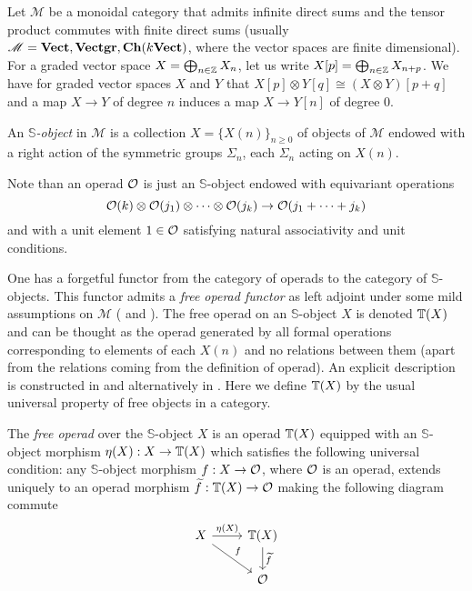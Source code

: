 \documentclass[TFM.tex]{subfiles}
\begin{document}
Let $\mathscr{M}$ be a monoidal category that admits infinite direct sums and the tensor product commutes with finite direct sums (usually $\mathscr{M}=\mathrm{\mathbf{Vect}}, \mathrm{\mathbf{Vectgr}},\mathrm{\mathbf{Ch}}(k\mathrm{\mathbf{Vect}})$, where the vector spaces are finite dimensional). For a graded vector space $X=\bigoplus_{n\in\mathbb{Z}}X_n$, let us write $X[p]=\bigoplus_{n\in\mathbb{Z}}X_{n+p}$. We have for graded vector spaces $X$ and $Y$ that $X[p]\otimes Y[q]\cong (X\otimes Y)[p+q]$ and a map $X\to Y$ of degree $n$ induces a map $X\to Y[n]$ of degree 0. 

\begin{defi}
 An \emph{$\mathbb{S}$-object} in $\mathscr{M}$ is a collection $X=\{X(n)\}_{n\geq 0}$ of objects of $\mathscr{M}$ endowed with a right action of the symmetric groups $\Sigma_n$, each $\Sigma_n$ acting on $X(n)$.
\end{defi}

Note than an operad ${\mathcal O}$ is just an $\mathbb{S}$-object endowed with
equivariant operations
\[{\mathcal O}(k)\otimes{\mathcal O}(j_1)\otimes\cdots\otimes{\mathcal O}(j_k)\to {\mathcal O}(j_1+\cdots+j_k)\]
and with a unit element $1 \in{\mathcal O}$ satisfying natural associativity and unit conditions.




One has a forgetful functor from the category of operads to the category of $\mathbb{S}$-objects. This functor admits a \emph{free operad functor} as left adjoint under some mild assumptions on $\mathscr{M}$ (\cite{GJ} and \cite[]{AlgebraicOperads}). The free operad on an $\mathbb{S}$-object $X$ is denoted $\mathbb{T}(X)$ and can be thought as the operad generated by all formal operations corresponding to elements of each $X(n)$ and no relations between them (apart from the relations coming from the definition of operad). An explicit description is constructed in \cite{GJ} and alternatively in \cite{AlgebraicOperads}. Here we define $\mathbb{T}(X)$ by the usual universal property of free objects in a category. 

\begin{defi}
The \emph{free operad} over the $\mathbb{S}$-object $X$ is an operad $\mathbb{T}(X)$ equipped with an $\mathbb{S}$-object morphism $\eta(X):X\to\mathbb{T}(X)$ which satisfies the following universal condition: any $\mathbb{S}$-object morphism $f:X\to {\mathcal O}$, where ${\mathcal O}$ is an operad, extends uniquely to an operad morphism $\widetilde{f}:\mathbb{T}(X)\to{\mathcal O}$ making the following diagram commute
\[
\begin{tikzcd}
X\arrow[r, "\eta(X)"]\arrow[dr,"f"] & \T(X)\arrow[d, "\widetilde{f}"]\\
& \OO
\end{tikzcd}
\] 
\end{defi}
\end{document}
